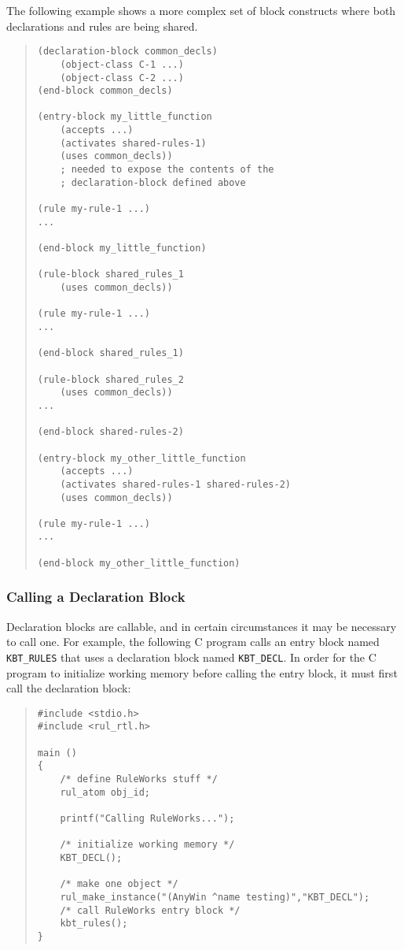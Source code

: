 The following example shows a more complex set of block constructs where both
declarations and rules are being shared.

\begin{quote}
\begin{verbatim}
(declaration-block common_decls)
    (object-class C-1 ...)
    (object-class C-2 ...)
(end-block common_decls)

(entry-block my_little_function
    (accepts ...)
    (activates shared-rules-1)
    (uses common_decls))
    ; needed to expose the contents of the
    ; declaration-block defined above

(rule my-rule-1 ...)
...

(end-block my_little_function)

(rule-block shared_rules_1
    (uses common_decls))

(rule my-rule-1 ...)
...

(end-block shared_rules_1)

(rule-block shared_rules_2
    (uses common_decls))
...

(end-block shared-rules-2)

(entry-block my_other_little_function
    (accepts ...)
    (activates shared-rules-1 shared-rules-2)
    (uses common_decls))

(rule my-rule-1 ...)
...

(end-block my_other_little_function)
\end{verbatim}
\end{quote}

\subsubsection*{Calling a Declaration Block}

Declaration blocks are callable, and in certain circumstances it may
be necessary to call one. For example, the following C program calls
an entry block named \verb|KBT_RULES| that uses a declaration block
named \verb|KBT_DECL|. In order for the C program to initialize
working memory before calling the entry block, it must first call the
declaration block:

\begin{quote}
\begin{verbatim}
#include <stdio.h>
#include <rul_rtl.h>

main ()
{
    /* define RuleWorks stuff */
    rul_atom obj_id;

    printf("Calling RuleWorks...");

    /* initialize working memory */
    KBT_DECL();

    /* make one object */
    rul_make_instance("(AnyWin ^name testing)","KBT_DECL");
    /* call RuleWorks entry block */
    kbt_rules();
}
\end{verbatim}
\end{quote}

